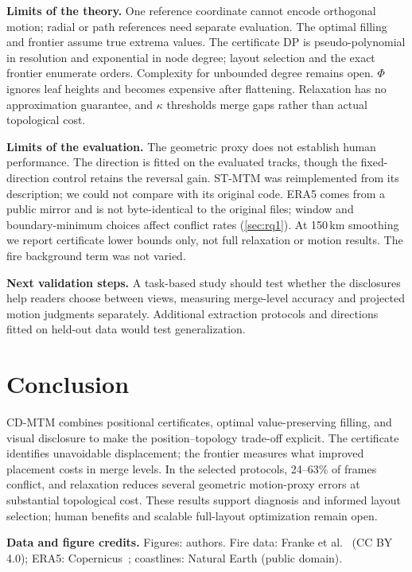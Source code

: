 \documentclass[review]{vgtc}                 %
\begin{document}
\textbf{Limits of the theory.} One reference coordinate cannot encode orthogonal motion; radial or path references need separate evaluation. The optimal filling and frontier assume true extrema values. The certificate DP is pseudo-polynomial in resolution and exponential in node degree; layout selection and the exact frontier enumerate orders. Complexity for unbounded degree remains open. $\Phi$ ignores leaf heights and becomes expensive after flattening. Relaxation has no approximation guarantee, and $\kappa$ thresholds merge gaps rather than actual topological cost.

\textbf{Limits of the evaluation.} The geometric proxy does not establish human performance. The direction is fitted on the evaluated tracks, though the fixed-direction control retains the reversal gain. ST-MTM was reimplemented from its description; we could not compare with its original code. ERA5 comes from a public mirror and is not byte-identical to the original files; window and boundary-minimum choices affect conflict rates (\cref{sec:rq1}). At 150\,km smoothing we report certificate lower bounds only, not full relaxation or motion results. The fire background term was not varied.

\textbf{Next validation steps.} A task-based study should test whether the disclosures help readers choose between views, measuring merge-level accuracy and projected motion judgments separately. Additional extraction protocols and directions fitted on held-out data would test generalization.

\section{Conclusion}
CD-MTM combines positional certificates, optimal value-preserving filling, and visual disclosure to make the position--topology trade-off explicit. The certificate identifies unavoidable displacement; the frontier measures what improved placement costs in merge levels. In the selected protocols, 24--63\% of frames conflict, and relaxation reduces several geometric motion-proxy errors at substantial topological cost. These results support diagnosis and informed layout selection; human benefits and scalable full-layout optimization remain open.

\noindent\textbf{Data and figure credits.}
\label{sec:figure_credits}
Figures: authors. Fire data: Franke et al.~\cite{Franke:2021:1DP} (CC BY 4.0); ERA5: Copernicus~\cite{Hersbach:2020:ERA5}; coastlines: Natural Earth (public domain).




\end{document}
